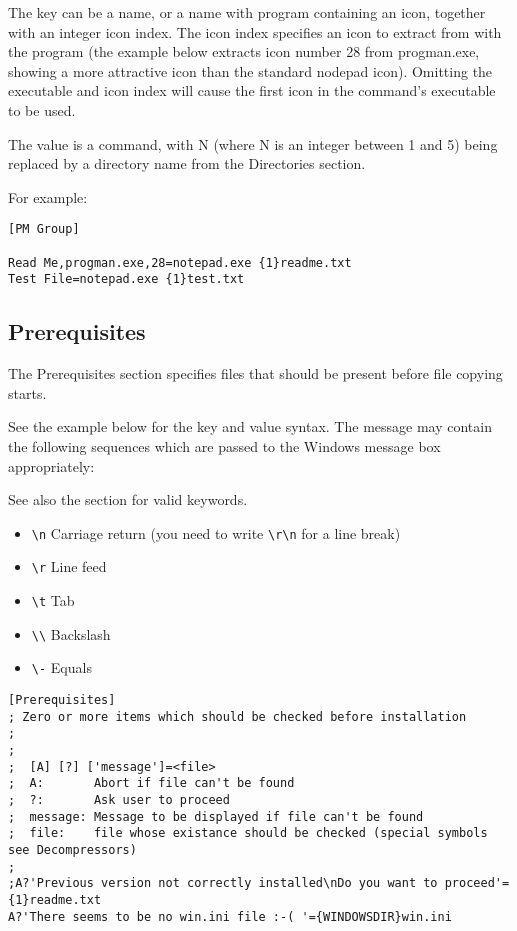 The key can be a name, or a name with program containing
an icon, together with an integer icon index. The icon index
specifies an icon to extract from with the program (the example
below extracts icon number 28 from progman.exe, showing a more
attractive icon than the standard nodepad icon). Omitting
the executable and icon index will cause the first icon in the
command's executable to be used.

The value is a command, with {N} (where N is an integer between
1 and 5) being replaced by a directory name from the Directories
section.

For example:

\begin{verbatim}
[PM Group] 

Read Me,progman.exe,28=notepad.exe {1}readme.txt
Test File=notepad.exe {1}test.txt
\end{verbatim}

\subsection{Prerequisites}

The Prerequisites section specifies files that should be
present before file copying starts.

See the example below for the key and value syntax.
The message may contain the following sequences which
are passed to the Windows message box appropriately:

See also the  section for
valid keywords.

\begin{itemize}\itemsep=0pt
\item \verb$\n$ Carriage return (you need to write \verb$\r\n$ for a line break)
\item \verb$\r$ Line feed
\item \verb$\t$ Tab
\item \verb$\\$ Backslash
\item \verb$\-$ Equals
\end{itemize}

\begin{verbatim}
[Prerequisites]
; Zero or more items which should be checked before installation
;
;
;  [A] [?] ['message']=<file>
;  A:       Abort if file can't be found
;  ?:       Ask user to proceed
;  message:	Message to be displayed if file can't be found
;  file:    file whose existance should be checked (special symbols see Decompressors)
;
;A?'Previous version not correctly installed\nDo you want to proceed'={1}readme.txt
A?'There seems to be no win.ini file :-( '={WINDOWSDIR}win.ini
\end{verbatim}

